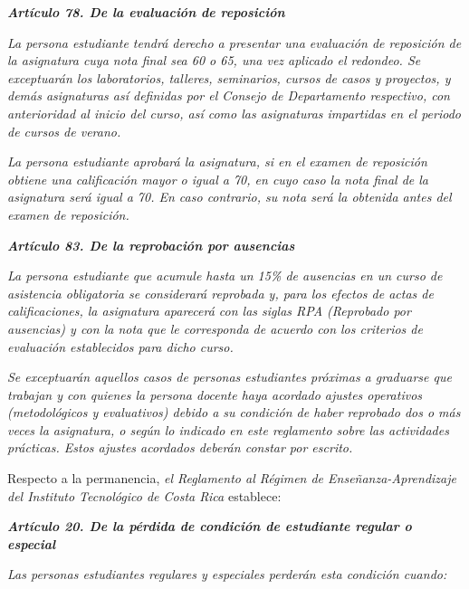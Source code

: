 \textit{\textbf{Artículo 78. De la evaluación de reposición}}\par

\textit{La persona estudiante tendrá derecho a presentar una evaluación de reposición de la asignatura cuya nota final sea 60 o 65, una vez aplicado el redondeo. Se exceptuarán los laboratorios, talleres, seminarios, cursos de casos y proyectos, y demás asignaturas así definidas por el Consejo de Departamento respectivo, con anterioridad al inicio del curso, así como las asignaturas impartidas en el periodo de cursos de verano.  }\par

\textit{La persona estudiante aprobará la asignatura, si en el examen de reposición obtiene una calificación mayor o igual a 70, en cuyo caso la nota final de la asignatura será igual a 70. En caso contrario, su nota será la obtenida antes del examen de reposición. }\par

\textit{\textbf{Artículo 83. De la reprobación por ausencias  }}\par

\textit{La persona estudiante que acumule hasta un 15\% de ausencias en un curso de asistencia obligatoria se considerará reprobada y, para los efectos de actas de calificaciones, la asignatura aparecerá con las siglas RPA (Reprobado por ausencias) y con la nota que le corresponda de acuerdo con los criterios de evaluación establecidos para dicho curso.  }\par

\textit{Se exceptuarán aquellos casos de personas estudiantes próximas a graduarse que trabajan y con quienes la persona docente haya acordado ajustes operativos (metodológicos y evaluativos) debido a su condición de haber reprobado dos o más veces la asignatura, o según lo indicado en este reglamento sobre las actividades prácticas. Estos ajustes acordados deberán constar por escrito.  }\par

Respecto a la permanencia, \textit{el Reglamento al Régimen de Enseñanza-Aprendizaje del Instituto Tecnológico de Costa Rica} establece:\par

\textit{\textbf{Artículo 20. De la pérdida de condición de estudiante regular o especial   }}\par

\textit{Las personas estudiantes regulares y especiales perderán esta condición cuando: }\par

